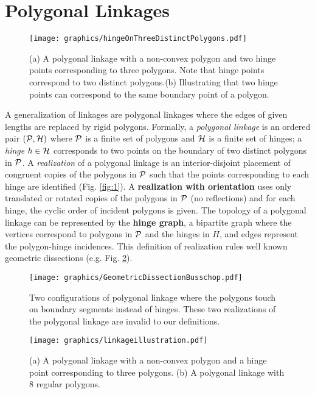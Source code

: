 \section{Polygonal Linkages}

\begin{figure}[h]
\begin{center}
\texttt{[image: graphics/hingeOnThreeDistinctPolygons.pdf]}
\end{center} 
\caption{(a) A polygonal linkage with a non-convex polygon and two hinge points corresponding to 
three polygons.  Note that hinge points correspond to two distinct polygons.(b) Illustrating that 
two hinge points can correspond to the same boundary point of a polygon.}
\label{fig:linkage-1}
\end{figure}
A generalization of linkages are polygonal linkages where the edges of given lengths are replaced 
by rigid polygons.  Formally, a \textit{polygonal linkage} is an ordered pair $\left({\cal P},{\cal H} 
\right)$ where ${\cal P}$ is a finite set of polygons and ${\cal H}$ is a finite set of hinges; a 
\textit{hinge} $h\in {\cal H}$ 
corresponds to two points on the boundary of two distinct polygons in ${\cal P}$.  A \emph{realization} 
of a polygonal linkage is an interior-disjoint placement of 
congruent copies of the polygons in ${\cal P}$ such that the points corresponding to each hinge are 
identified (Fig. \ref{fig:1}). 
A \textbf{realization with orientation} uses only translated or rotated copies of the polygons in ${\cal P}$ (no reflections) and for each hinge, the cyclic order of incident polygons is given. 
The topology of a polygonal linkage can be represented by the \textbf{hinge graph}, a bipartite graph where the vertices correspond to polygons in ${\cal P}$ and the hinges in $H$, and edges represent the polygon-hinge incidences.
This definition of realization rules well known geometric 
dissections (e.g. Fig. \ref{fig:polygonallinkage-4}).
\begin{figure}[h]
\begin{center}
\texttt{[image: graphics/GeometricDissectionBusschop.pdf]}
\end{center}
\caption{Two configurations of polygonal linkage where the polygons touch on boundary segments 
instead of hinges.  These two realizations of the polygonal linkage are invalid to our definitions. 
 }
\label{fig:polygonallinkage-4}
\end{figure}

\begin{figure}[h]
\begin{center}
\texttt{[image: graphics/linkageillustration.pdf]}
\end{center} 
\caption{(a) A polygonal linkage with a non-convex polygon and a hinge point corresponding to three 
polygons.  (b) A polygonal linkage with 8 regular polygons.}
\label{fig:linkage-2}
\end{figure}


